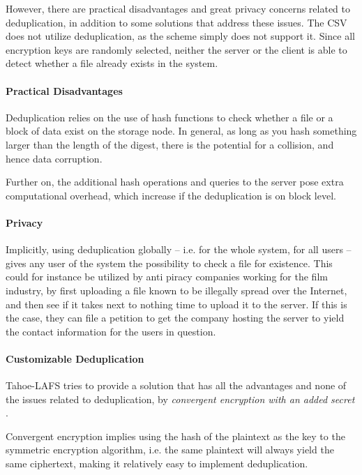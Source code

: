 \documentclass[pdftex,english,10pt,b5paper,twoside]{book}
\begin{document}
However, there are practical disadvantages and great privacy concerns related
to deduplication, in addition to some solutions that address these issues.
The \ac{CSV} does not utilize deduplication, as the scheme simply does not
support it. Since all encryption keys are randomly selected, neither the server
or the client is able to detect whether a file already exists in the system.

\paragraph{Practical Disadvantages} Deduplication relies on the use of hash
functions to check whether a file or a block of data exist on the storage node.
In general, as long as you hash something larger than the length of the digest,
there is the potential for a collision, and hence data corruption.

Further on, the additional hash operations and queries to the server pose
extra computational overhead, which increase if the deduplication is on block
level.

\paragraph{Privacy} Implicitly, using deduplication globally -- i.e. for the
whole system, for all users -- gives any user of the system the possibility to
check a file for existence. This could for instance be utilized by anti piracy
companies working for the film industry, by first uploading a file known to be
illegally spread over the Internet, and then see if it takes next to nothing
time to upload it to the server. If this is the case, they can file a petition
to get the company hosting the server to yield the contact information for the
users in question.

\paragraph{Customizable Deduplication} Tahoe-\ac{LAFS} tries to provide a
solution that has all the advantages and none of the issues related to
deduplication, by \emph{convergent encryption with an added secret}
\cite{tahoe}.

Convergent encryption implies using the hash of the plaintext as the key to the
symmetric encryption algorithm, i.e. the same plaintext will always yield the
same ciphertext, making it relatively easy to implement deduplication.
\end{document}
